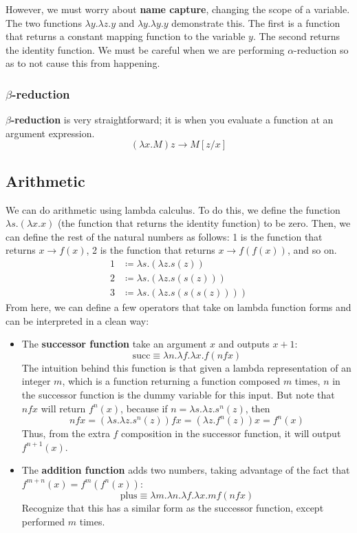 \documentclass[12pt]{article}
\begin{document}
	However, we must worry about \textbf{name capture}, changing the scope of a variable. The two functions $\lambda y.\lambda z.y$ and $\lambda y.\lambda y.y$ demonstrate this. The first is a function that returns a constant mapping function to the variable $y$. The second returns the identity function. We must be careful when we are performing $\alpha$-reduction so as to not cause this from happening. 

	\subsubsection*{$\beta$-reduction}
	\textbf{$\beta$-reduction} is very straightforward; it is when you evaluate a function at an argument expression. \[ (\lambda x.M)z \to M[z/x] \]

	\subsection*{Arithmetic}
	We can do arithmetic using lambda calculus. To do this, we define the function $\lambda s.(\lambda x.x)$ (the function that returns the identity function) to be zero. Then, we can define the rest of the natural numbers as follows: 1 is the function that returns $x \to f(x)$, 2 is the function that returns $x \to f(f(x))$, and so on.
	\[ 
	 	\begin{aligned}
	 		1 &\coloneqq \lambda s.(\lambda z.s(z)) \\
	 		2 &\coloneqq \lambda s.(\lambda z.s(s(z))) \\
	 		3 &\coloneqq \lambda s.(\lambda z.s(s(s(z))))
	 	\end{aligned}
	 \] 
	 From here, we can define a few operators that take on lambda function forms and can be interpreted in a clean way:
	 \begin{itemize}
	 	\item The \textbf{successor function} take an argument $x$ and outputs $x+1$: \[ \text{succ} \equiv \lambda n.\lambda f.\lambda x.f(nfx)\]
	 	The intuition behind this function is that given a lambda representation of an integer $m$, which is a function returning a function composed $m$ times, $n$ in the successor function is the dummy variable for this input. But note that $nfx$ will return $f^n(x)$, because if $n = \lambda s.\lambda z.s^n(z)$, then \[ nfx = (\lambda s.\lambda z.s^n(z))fx = (\lambda z.f^n(z))x = f^n(x) \] Thus, from the extra $f$ composition in the successor function, it will output $f^{n+1}(x)$.
	 	\item The \textbf{addition function} adds two numbers, taking advantage of the fact that $f^{m+n}(x) = f^m(f^n(x))$: 
	 	\[ \text{plus} \equiv \lambda m.\lambda n.\lambda f.\lambda x.mf(nfx)\] Recognize that this has a similar form as the successor function, except performed $m$ times.
	 \end{itemize}
\end{document}
